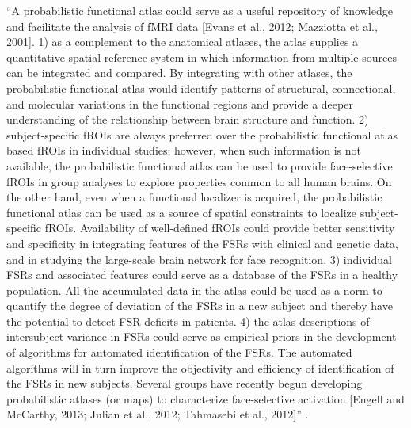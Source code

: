 ``A probabilistic functional atlas could serve as a useful repository of
knowledge and facilitate the analysis of fMRI data [Evans et al., 2012;
Mazziotta et al., 2001].
%
1) as a complement to the anatomical atlases, the atlas supplies a quantitative
spatial reference system in which information from multiple sources can be
integrated and compared.
%
By integrating with other atlases, the probabilistic functional atlas would
identify patterns of structural, connectional, and molecular variations in the
functional regions and provide a deeper understanding of the relationship
between brain structure and function.
%
2) subject-specific fROIs are always preferred over the probabilistic functional
atlas based fROIs in individual studies;
%
however, when such information is not available, the probabilistic functional
atlas can be used to provide face-selective fROIs in group analyses to explore
properties common to all human brains.
%
On the other hand, even when a functional localizer is acquired, the
probabilistic functional atlas can be used as a source of spatial constraints to
localize subject-specific fROIs.
%
Availability of well-defined fROIs could provide better sensitivity and
specificity in integrating features of the FSRs with clinical and genetic data,
and in studying the large-scale brain network for face recognition.
%
3) individual FSRs and associated features could serve as a
database of the FSRs in a healthy population.
%
All the accumulated data in the atlas could be used as a norm to quantify the
degree of deviation of the FSRs in a new subject and thereby have the potential
to detect FSR deficits in patients.
%
4) the atlas descriptions of intersubject variance in FSRs could serve as
empirical priors in the development of algorithms for automated identification
of the FSRs.
%
The automated algorithms will in turn improve the objectivity and efficiency of
identification of the FSRs in new subjects.
%
Several groups have recently begun developing probabilistic atlases (or maps) to
characterize face-selective activation [Engell and McCarthy, 2013; Julian et
al., 2012; Tahmasebi et al., 2012]'' \citep{zhen2015quantifying}.

